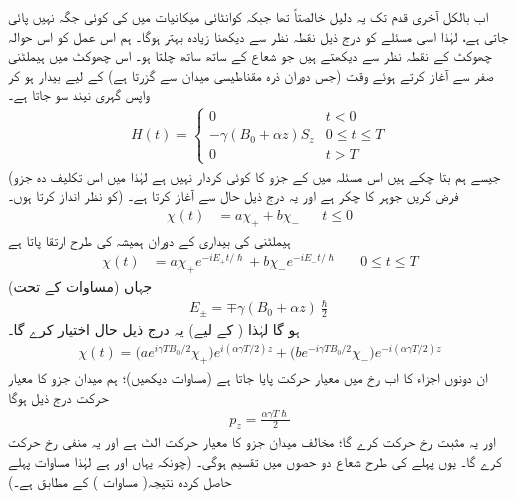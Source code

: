  اب بالکل آخری قدم تک یہ دلیل خالصتاً  تھا جبکہ کوانٹائی میکانیات میں  کی کوئی جگہ نہیں پائی جاتی ہے، لہٰذا اسی مسئلے کو درج ذیل نقطہ نظر سے دیکھنا زیادہ بہتر ہوگا۔ ہم اس عمل کو اس حوالہ چھوکٹ کے نقطہ نظر سے دیکھتے ہیں جو شعاع کے ساتھ ساتھ چلتا ہو۔ اس چھوکٹ میں ہیملٹنی صفر سے آغاز کرتے ہوئے وقت  (جس دوران ذرہ مقناطیسی میدان سے گزرتا ہے) کے لیے بیدار ہو کر واپس گہری نیند سو جاتا ہے۔
\begin{align}
H (t) = 
\begin{cases}
0 & t < 0 \\
- \gamma (B_0 + \alpha z) S_z & 0 \le t \le T \\
0 & t > T
\end{cases}
\end{align}
(جیسے ہم بتا چکے ہیں اس مسئلہ میں  کے  جزو کا کوئی کردار نہیں ہے لہٰذا میں اس تکلیف دہ جزو کو نظر انداز کرتا ہوں۔) فرض کریں جوہر کا چکر  ہے اور یہ درج ذیل حال سے آغاز کرتا ہے۔ 
\begin{align*}
\chi (t) &= a \chi_{+} + b\chi_{-} && t\le 0
\end{align*}
ہیملٹنی کی بیداری کے دوران  ہمیشہ کی طرح ارتقا پاتا ہے 
\begin{align*}
\chi (t) &= a \chi_{+} e^{- i E_{+} t/\hslash} + b \chi_{-} e^{- i E_{-} t/\hslash} && 0 \le t \le T
\end{align*}
جہاں (مساوات  کے تحت) 
\begin{align}
E_{\pm} = \mp \gamma (B_0 + \alpha z) \frac{\hslash}{2}
\end{align} 
 ہو گا لہٰذا (  کے لیے) یہ درج ذیل حال اختیار کرے گا۔ 
\begin{align}
\chi (t) = \big ( a e^{i \gamma T B_0 /2} \chi_{+} \big ) e^{i (\alpha \gamma T/2) z} + \big ( b e^{- i \gamma T B_0 /2} \chi_{-} \big ) e^{- i (\alpha \gamma T/2) z}
\end{align}
ان دونوں اجزاء کا اب  رخ میں معیار حرکت پایا جاتا ہے (مساوات  دیکھیں)؛ ہم میدان جزو کا معیار حرکت درج ذیل ہوگا 
\begin{align}\label{مساوات_تین_ابعادی_کوانٹائی_زیڈ_معیار_حرکت}
p_z = \frac{\alpha \gamma T \hslash}{2}
\end{align}
اور یہ مثبت  رخ حرکت کرے گا؛ مخالف میدان جزو کا معیار حرکت الٹ ہے اور یہ منفی  رخ حرکت کرے گا۔ یوں پہلے کی طرح شعاع دو حصوں میں تقسیم ہوگی۔ (چونکہ 
یہاں  اور  ہے لہٰذا مساوات  پہلے حاصل کردہ نتیجہ( مساوات ) کے مطابق ہے۔)

